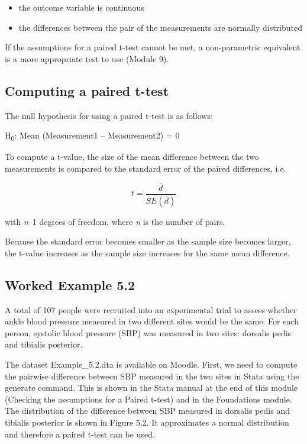 \documentclass[
]{memoir}
\providecommand{\tightlist}{%
  \setlength{\itemsep}{0pt}\setlength{\parskip}{0pt}}
\begin{document}
\begin{itemize}
\tightlist
\item
  the outcome variable is continuous
\item
  the differences between the pair of the measurements are normally distributed
\end{itemize}

If the assumptions for a paired t-test cannot be met, a non-parametric equivalent is a more appropriate test to use (Module 9).

\hypertarget{computing-a-paired-t-test}{%
\subsection{Computing a paired t-test}\label{computing-a-paired-t-test}}

The null hypothesis for using a paired t-test is as follows:

H\textsubscript{0}: Mean (Measurement1 -- Measurement2) = 0

To compute a t-value, the size of the mean difference between the two measurements is compared to the standard error of the paired differences, i.e.

\[t = \frac{\overline{d}}{SE(\overline{d})}\]

with \emph{n}--1 degrees of freedom, where \emph{n} is the number of pairs.

Because the standard error becomes smaller as the sample size becomes larger, the t-value increases as the sample size increases for the same mean difference.

\hypertarget{worked-example-5.2}{%
\subsection{Worked Example 5.2}\label{worked-example-5.2}}

A total of 107 people were recruited into an experimental trial to assess whether ankle blood pressure measured in two different sites would be the same. For each person, systolic blood pressure (SBP) was measured in two sites: dorsalis pedis and tibialis posterior.

The dataset Example\_5.2.dta is available on Moodle. First, we need to compute the pairwise difference between SBP measured in the two sites in Stata using the generate command. This is shown in the Stata manual at the end of this module (Checking the assumptions for a Paired t-test) and in the Foundations module. The distribution of the difference between SBP measured in dorsalis pedis and tibialis posterior is shown in Figure 5.2. It approximates a normal distribution and therefore a paired t-test can be used.
\end{document}
